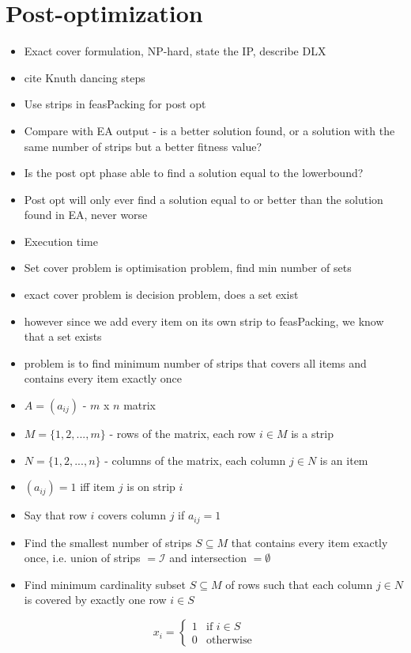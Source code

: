 \documentclass{elsarticle}
\begin{document}
\section{Post-optimization}
\begin{itemize}
	\item Exact cover formulation, NP-hard, state the IP, describe DLX
	\item cite Knuth dancing steps
	\item Use strips in feasPacking for post opt
	\item Compare with EA output - is a better solution found, or a solution with the same number of strips but a better fitness value?
	\item Is the post opt phase able to find a solution equal to the lowerbound?
	\item Post opt will only ever find a solution equal to or better than the solution found in EA, never worse
	\item Execution time
	\item Set cover problem is optimisation problem, find min number of sets
	\item exact cover problem is decision problem, does a set exist
	\item however since we add every item on its own strip to feasPacking, we know that a set exists
	\item problem is to find minimum number of strips that covers all items and contains every item exactly once
	\item $A = (a_{ij})$ - $m$ x $n$ matrix
	\item $M = \{1, 2,..., m\}$ - rows of the matrix, each row $i \in M$ is a strip
	\item $N = \{1, 2,...,n\}$ - columns of the matrix, each column $j \in N$ is an item
	\item $(a_{ij}) = 1$ iff item $j$ is on strip $i$
	\item Say that row $i$ covers column $j$ if $a_{ij} = 1$
	\item Find the smallest number of strips $S \subseteq M$ that contains every item exactly once, i.e. union of strips $= \mathcal{I}$ and intersection $= \emptyset$
	\item Find minimum cardinality subset $S \subseteq M$ of rows such that each column $j \in N$ is covered by exactly one row $i \in S$	
\end{itemize}
\[x_i =
\begin{cases} 
	1 & \text{if } i \in S \\
	0 & \text{otherwise} 
\end{cases}
\]
\end{document}
